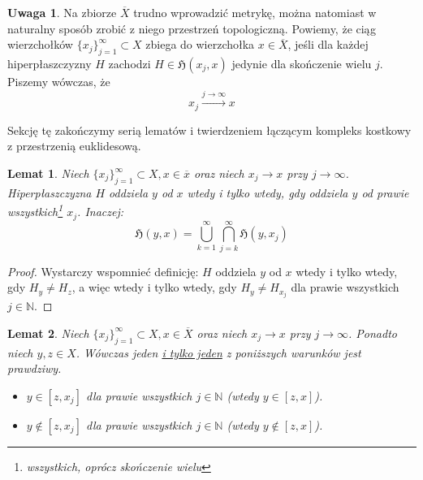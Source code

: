 \documentclass[licencjacka]{pracamgr}
\theoremstyle{definition}
\theoremstyle{definition}
\newtheorem{remark}{Uwaga}[section]
\theoremstyle{definition}
\theoremstyle{definition}
\theoremstyle{definition}
\theoremstyle{plain}
\newtheorem{lemma}{Lemat}[section]
\theoremstyle{plain}
\begin{document}
\begin{remark}
	Na zbiorze $ \overline{X} $ trudno wprowadzić metrykę, można natomiast w naturalny 
	sposób zrobić z niego przestrzeń topologiczną. Powiemy, że ciąg wierzchołków 
	$ \{x_j\}_{j = 1}^{\infty} \subset X $ zbiega do wierzchołka $ x \in \overline{X} $, jeśli 
	dla każdej hiperpłaszczyzny $ H $ zachodzi $ H \in \mathfrak{H}(x_j, x) $ jedynie 
	dla skończenie wielu $ j $. Piszemy wówczas, że $$ x_j 
	\xrightarrow{j \rightarrow \infty} x $$
\end{remark}

Sekcję tę zakończymy serią lematów i twierdzeniem łączącym kompleks 
kostkowy z przestrzenią euklidesową.

\begin{lemma}
	Niech $ \{x_j\}_{j = 1}^{\infty} \subset X, x \in \overline{x} $ oraz niech 
	$ x_j \rightarrow x$ przy $ j \rightarrow \infty $. Hiperpłaszczyzna $ H $ 
	oddziela $ y $ od $ x $ wtedy i tylko wtedy, gdy oddziela $ y $ od prawie 
	wszystkich\footnote{wszystkich, oprócz skończenie wielu} $ x_j $. Inaczej:
	$$ \mathfrak{H}(y,x) = \bigcup\limits_{k = 1}^{\infty} \bigcap\limits_{j = k}^{\infty}
	\mathfrak{H}(y,x_j) $$
\end{lemma}
\begin{proof}
	Wystarczy wspomnieć definicję: $ H $ oddziela $ y $ od $ x $ wtedy i tylko wtedy, gdy 
	$ H_y \neq H_z $, a więc wtedy i tylko wtedy, gdy $H_y \neq H_{x_j} $ dla prawie 
	wszystkich $ j \in \mathbb{N} $. 
\end{proof}
\begin{lemma}
	Niech $ \{x_j\}_{j = 1}^{\infty} \subset X, x \in \overline{X} $ oraz niech 
	$ x_j \rightarrow x$ przy $ j \rightarrow \infty $. Ponadto niech $ y,z \in X $. 
	Wówczas jeden \underline{i tylko jeden} z poniższych warunków jest prawdziwy.
	\begin{itemize}
		\item $ y \in [z,x_j] $ dla prawie wszystkich $ j \in \mathbb{N} $
		(wtedy $ y \in [z,x]$).
		\item $ y \notin [z,x_j] $ dla prawie wszystkich $ j \in \mathbb{N} $
		(wtedy $ y \notin [z,x] $).
	\end{itemize}
\end{lemma}
\end{document}
